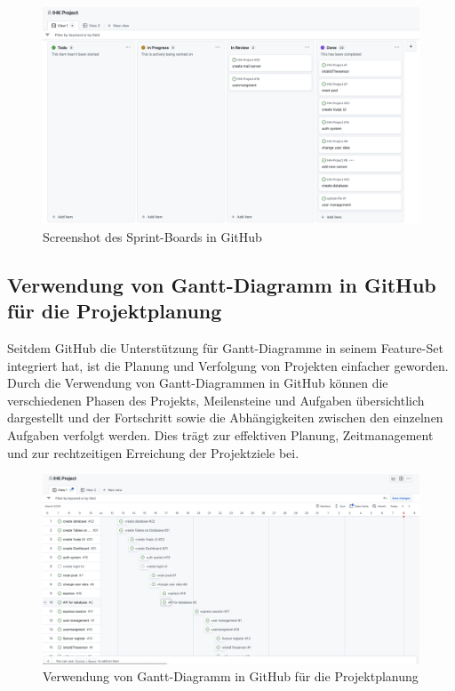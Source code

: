 \begin{figure}[htbp]
	\centering
	\includegraphics[width=1\textwidth]{img/github_canban.png}
	\caption{Screenshot des Sprint-Boards in GitHub}
	\label{Screenshot des Sprint-Boards in GitHub}
\end{figure}
\clearpage

\subsection{Verwendung von Gantt-Diagramm in GitHub für die Projektplanung}\label{appendix:b2}\par

Seitdem GitHub die Unterstützung für Gantt-Diagramme in seinem Feature-Set integriert hat, ist die Planung und Verfolgung von Projekten einfacher geworden. Durch die Verwendung von Gantt-Diagrammen in GitHub können die verschiedenen Phasen des Projekts, Meilensteine und Aufgaben übersichtlich dargestellt und der Fortschritt sowie die Abhängigkeiten zwischen den einzelnen Aufgaben verfolgt werden. Dies trägt zur effektiven Planung, Zeitmanagement und zur rechtzeitigen Erreichung der Projektziele bei.
\begin{figure}[htbp]
	\centering
	\includegraphics[width=1\textwidth]{img/github_diaramm.png}
	\caption{Verwendung von Gantt-Diagramm in GitHub für die Projektplanung}
	\label{Verwendung von Gantt-Diagramm in GitHub für die Projektplanung}
\end{figure}
\clearpage

